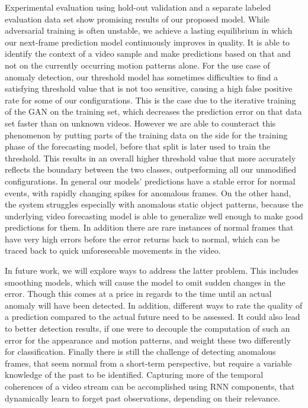 Experimental evaluation using hold-out validation and a separate labeled evaluation data set show promising results of our proposed model. While adversarial training is often unstable, we achieve a lasting equilibrium in which our next-frame prediction model continuously improves in quality. It is able to identify the context of a video sample and make predictions based on that and not on the currently occurring motion patterns alone. For the use case of anomaly detection, our threshold model has sometimes difficulties to find a satisfying threshold value that is not too sensitive, causing a high false positive rate for some of our configurations. This is the case due to the iterative training of the GAN on the training set, which decreases the prediction error on that data set faster than on unknown videos. However we are able to counteract this phenomenon by putting parts of the training data on the side for the training phase of the forecasting model, before that split is later used to train the threshold. This results in an overall higher threshold value that more accurately reflects the boundary between the two classes, outperforming all our unmodified configurations. In general our models' predictions have a stable error for normal events, with rapidly changing spikes for anomalous frames. On the other hand, the system struggles especially with anomalous static object patterns, because the underlying video forecasting model is able to generalize well enough to make good predictions for them. In addition there are rare instances of normal frames that have very high errors before the error returns back to normal, which can be traced back to quick unforeseeable movements in the video.

In future work, we will explore ways to address the latter problem. This includes smoothing models, which will cause the model to omit sudden changes in the error. Though this comes at a price in regards to the time until an actual anomaly will have been detected. In addition, different ways to rate the quality of a prediction compared to the actual future need to be assessed. It could also lead to better detection results, if one were to decouple the computation of such an error for the appearance and motion patterns, and weight these two differently for classification. Finally there is still the challenge of detecting anomalous frames, that seem normal from a short-term perspective, but require a variable knowledge of the past to be identified. Capturing more of the temporal coherences of a video stream can be accomplished using RNN components, that dynamically learn to forget past observations, depending on their relevance.